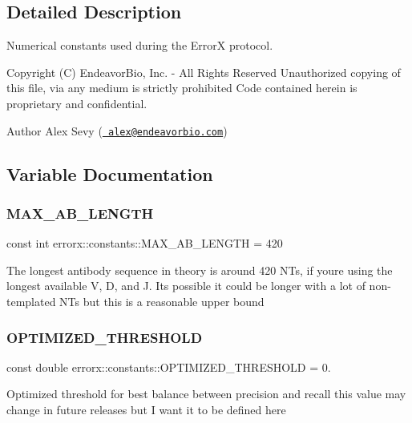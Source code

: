 \subsection{Detailed Description}
Numerical constants used during the ErrorX protocol. 

Copyright (C) Endeavor\+Bio, Inc. -\/ All Rights Reserved Unauthorized copying of this file, via any medium is strictly prohibited Code contained herein is proprietary and confidential.

\begin{DoxyAuthor}{Author}
Alex Sevy (\href{mailto:alex@endeavorbio.com}{\texttt{ alex@endeavorbio.\+com}}) 
\end{DoxyAuthor}


\subsection{Variable Documentation}
\mbox{\label{constants_8hh_file_a375af5a0f72048bbfc4165741c051a28}} 
\subsubsection{\texorpdfstring{MAX\_AB\_LENGTH}{MAX\_AB\_LENGTH}}
{\footnotesize\ttfamily const int errorx\+::constants\+::\+M\+A\+X\+\_\+\+A\+B\+\_\+\+L\+E\+N\+G\+TH = 420}

The longest antibody sequence in theory is around 420 N\+Ts, if you\textquotesingle{}re using the longest available V, D, and J. It\textquotesingle{}s possible it could be longer with a lot of non-\/templated N\+Ts but this is a reasonable upper bound \mbox{\label{constants_8hh_file_aadcca59533023a224a8b90e25435295f}} 
\subsubsection{\texorpdfstring{OPTIMIZED\_THRESHOLD}{OPTIMIZED\_THRESHOLD}}
{\footnotesize\ttfamily const double errorx\+::constants\+::\+O\+P\+T\+I\+M\+I\+Z\+E\+D\+\_\+\+T\+H\+R\+E\+S\+H\+O\+LD = 0.}

Optimized threshold for best balance between precision and recall this value may change in future releases but I want it to be defined here \mbox{\label{constants_8hh_file_afd1a9537101a0b1aa366f9253916a7ee}} 

